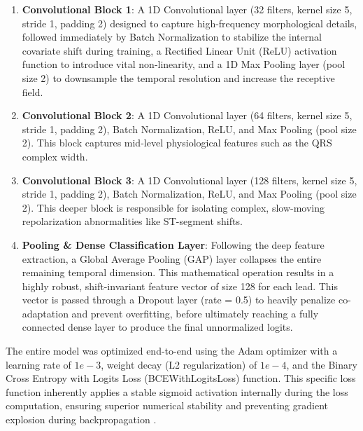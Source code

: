 \documentclass[10pt,twocolumn,letterpaper]{article}
\begin{document}
\begin{enumerate}
    \item \textbf{Convolutional Block 1}: A 1D Convolutional layer (32 filters, kernel size 5, stride 1, padding 2) designed to capture high-frequency morphological details, followed immediately by Batch Normalization to stabilize the internal covariate shift during training, a Rectified Linear Unit (ReLU) activation function to introduce vital non-linearity, and a 1D Max Pooling layer (pool size 2) to downsample the temporal resolution and increase the receptive field.
    \item \textbf{Convolutional Block 2}: A 1D Convolutional layer (64 filters, kernel size 5, stride 1, padding 2), Batch Normalization, ReLU, and Max Pooling (pool size 2). This block captures mid-level physiological features such as the QRS complex width.
    \item \textbf{Convolutional Block 3}: A 1D Convolutional layer (128 filters, kernel size 5, stride 1, padding 2), Batch Normalization, ReLU, and Max Pooling (pool size 2). This deeper block is responsible for isolating complex, slow-moving repolarization abnormalities like ST-segment shifts.
    \item \textbf{Pooling \& Dense Classification Layer}: Following the deep feature extraction, a Global Average Pooling (GAP) layer collapses the entire remaining temporal dimension. This mathematical operation results in a highly robust, shift-invariant feature vector of size 128 for each lead. This vector is passed through a Dropout layer (rate = 0.5) to heavily penalize co-adaptation and prevent overfitting, before ultimately reaching a fully connected dense layer to produce the final unnormalized logits.
\end{enumerate}

The entire model was optimized end-to-end using the Adam optimizer \cite{kingma2014adam} with a learning rate of $1e-3$, weight decay (L2 regularization) of $1e-4$, and the Binary Cross Entropy with Logits Loss (BCEWithLogitsLoss) function. This specific loss function inherently applies a stable sigmoid activation internally during the loss computation, ensuring superior numerical stability and preventing gradient explosion during backpropagation \cite{goodfellow2016deep}.
\end{document}
